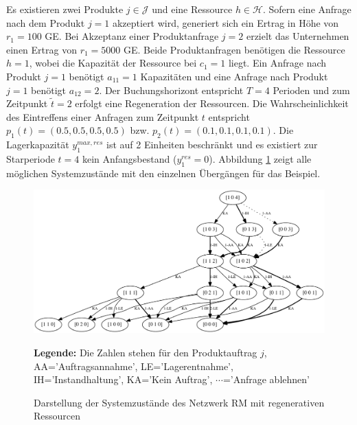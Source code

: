 Es existieren zwei Produkte $j\in\mathcal{J}$ und eine Ressource $h\in\mathcal{H}$. Sofern eine Anfrage nach dem Produkt $j=1$ akzeptiert wird, generiert sich ein Ertrag in Höhe von $r_1=100$ GE. Bei Akzeptanz einer Produktanfrage $j=2$ erzielt das Unternehmen einen Ertrag von $r_1=5000$ GE. Beide Produktanfragen benötigen die Ressource $h=1$, wobei die Kapazität der Ressource bei $c_1=1$ liegt. Ein Anfrage nach Produkt $j=1$ benötigt $a_{11}=1$ Kapazitäten und eine Anfrage nach Produkt $j=1$ benötigt $a_{12}=2$. Der Buchungshorizont entspricht $T=4$ Perioden und zum Zeitpunkt $\tilde{t}=2$ erfolgt eine Regeneration der Ressourcen. Die Wahrscheinlichkeit des Eintreffens einer Anfragen zum Zeitpunkt $t$ entspricht $ p_{1}(t)=(0.5, 0.5, 0.5, 0.5)$ bzw. $ p_{2}(t)=(0.1, 0.1, 0.1, 0.1)$. Die Lagerkapazität $y_1^{max,res}$ ist auf 2 Einheiten beschränkt und es existiert zur Starperiode $t=4$ kein Anfangsbestand ($y_1^{res}=0$). Abbildung \ref{B6} zeigt alle möglichen Systemzustände mit den einzelnen Übergängen für das Beispiel. 

\begin{figure}[h!]
  \begin{center}
    \includegraphics[width=140mm]{Bilder/Beispiel6.pdf}
    \caption{Darstellung der Systemzustände des Netzwerk RM mit regenerativen Ressourcen}  \label{B6}
    {\footnotesize \textbf{Legende:} Die Zahlen stehen für den Produktauftrag $j$, AA='Auftragsannahme', LE='Lagerentnahme', IH='Instandhaltung', KA='Kein Auftrag', $\cdots$='Anfrage ablehnen'} 
  \end{center}
\end{figure}

